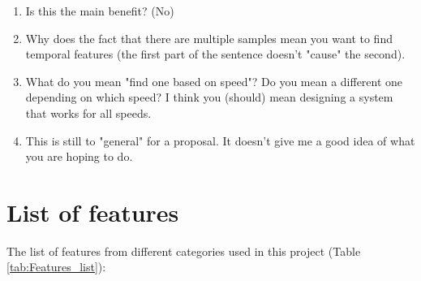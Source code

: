 \documentclass[final,twocolumn]{elsarticle}
\begin{document}
\begin{enumerate}[(1)]
\item Is this the main benefit? (No)
\item Why does the fact that there are multiple samples mean you want to find temporal features (the first part of the sentence doesn't "cause" the second).
\item What do you mean "find one based on speed"?  Do you mean a different one depending on which speed?  I think you (should) mean designing a system that works for all speeds. 
\item This is still to "general" for a proposal.  It doesn't give me a good idea of what you are hoping to do.
\end{enumerate}    
    

 



\onecolumn
\appendix
\section{List of features}
The list of features from different categories used in this project (Table \ref{tab:Features_list}):


\end{document}
